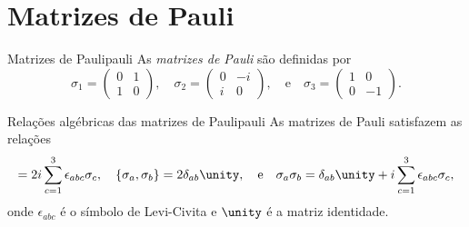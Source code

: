 \section{Matrizes de Pauli}
\begin{definition}{Matrizes de Pauli}{pauli}
    As \emph{matrizes de Pauli} são definidas por
    \begin{equation*}
        \sigma_1 = \begin{pmatrix}
            0&1\\1&0
        \end{pmatrix},\quad\sigma_2 = \begin{pmatrix}
            0&-i\\i&0
        \end{pmatrix},\quad\text{e}\quad\sigma_3 = \begin{pmatrix}
            1&0\\0&-1
        \end{pmatrix}.
    \end{equation*}
\end{definition}
\begin{proposition}{Relações algébricas das matrizes de Pauli}{pauli}
    As matrizes de Pauli satisfazem as relações
    \begin{equation*}
        [\sigma_a,\sigma_b] = 2i \sum_{c = 1}^3 \epsilon_{abc}\sigma_c,\quad
        \{\sigma_a, \sigma_b\} = 2\delta_{ab} \unity,\quad\text{e}\quad
        \sigma_a \sigma_b = \delta_{ab} \unity + i \sum_{c = 1}^3 \epsilon_{abc}\sigma_c,
    \end{equation*}
    onde \(\epsilon_{abc}\) é o símbolo de Levi-Civita e \(\unity\) é a matriz identidade.
\end{proposition}
